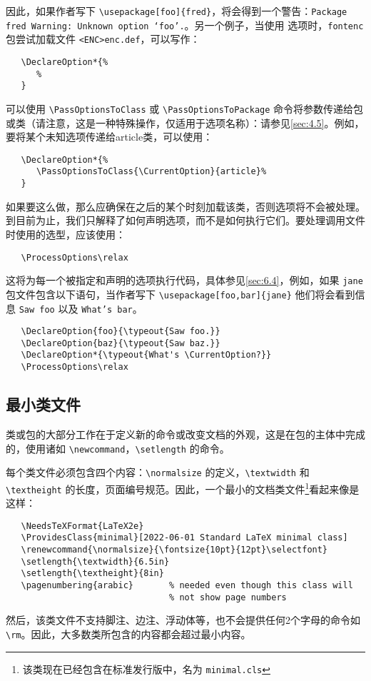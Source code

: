 \documentclass[12pt]{ltxguide}
\begin{document}
因此，如果作者写下 \verb|\usepackage[foo]{fred}|，将会得到一个警告：\texttt{Package fred Warning: Unknown option `foo'.}。另一个例子，当使用  选项时，\verb|fontenc| 包尝试加载文件 \verb|<ENC>enc.def|，可以写作：
\begin{verbatim}
   \DeclareOption*{%
      %
   }
\end{verbatim}

可以使用 \verb|\PassOptionsToClass| 或 \verb|\PassOptionsToPackage| 命令将参数传递给包或类（请注意，这是一种特殊操作，仅适用于选项名称）：请参见\ref{sec:4.5}。例如，要将某个未知选项传递给article类，可以使用：
\begin{verbatim}
   \DeclareOption*{%
      \PassOptionsToClass{\CurrentOption}{article}%
   }
\end{verbatim}
如果要这么做，那么应确保在之后的某个时刻加载该类，否则选项将不会被处理。到目前为止，我们只解释了如何声明选项，而不是如何执行它们。要处理调用文件时使用的选型，应该使用：
\begin{verbatim}
   \ProcessOptions\relax
\end{verbatim}

这将为每一个被指定和声明的选项执行代码，具体参见\ref{sec:6.4}，例如，如果 \verb|jane| 包文件包含以下语句，当作者写下 \verb|\usepackage[foo,bar]{jane}| 他们将会看到信息 \texttt{Saw foo} 以及 \texttt{What's bar}。
\begin{verbatim}
   \DeclareOption{foo}{\typeout{Saw foo.}}
   \DeclareOption{baz}{\typeout{Saw baz.}}
   \DeclareOption*{\typeout{What's \CurrentOption?}}
   \ProcessOptions\relax
\end{verbatim}
%
\subsection{最小类文件}
类或包的大部分工作在于定义新的命令或改变文档的外观，这是在包的主体中完成的，使用诸如 \verb|\newcommand|，\verb|\setlength| 的命令。

每个类文件必须包含四个内容：\verb|\normalsize| 的定义，\verb|\textwidth| 和 \verb|\textheight| 的长度，页面编号规范。因此，一个最小的文档类文件\footnote{该类现在已经包含在标准发行版中，名为 \texttt{minimal.cls}}看起来像是这样：
\begin{verbatim}
   \NeedsTeXFormat{LaTeX2e}
   \ProvidesClass{minimal}[2022-06-01 Standard LaTeX minimal class]
   \renewcommand{\normalsize}{\fontsize{10pt}{12pt}\selectfont}
   \setlength{\textwidth}{6.5in}
   \setlength{\textheight}{8in}
   \pagenumbering{arabic}       % needed even though this class will
                                % not show page numbers
\end{verbatim}
然后，该类文件不支持脚注、边注、浮动体等，也不会提供任何2个字母的命令如 \verb|\rm|。因此，大多数类所包含的内容都会超过最小内容。
%
\end{document}
